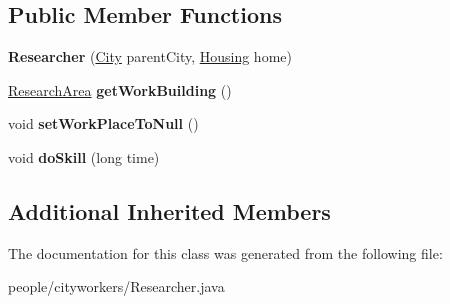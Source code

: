 \subsection*{Public Member Functions}
\begin{DoxyCompactItemize}
\item 
{\bfseries Researcher} (\hyperlink{classcities_1_1_city}{City} parent\+City, \hyperlink{classbuildings_1_1housing_1_1_housing}{Housing} home)\hypertarget{classpeople_1_1cityworkers_1_1_researcher_a28ed340e0d7dedaf7db8d75c72ba9c69}{}\label{classpeople_1_1cityworkers_1_1_researcher_a28ed340e0d7dedaf7db8d75c72ba9c69}

\item 
\hyperlink{classbuildings_1_1workplaces_1_1_research_area}{Research\+Area} {\bfseries get\+Work\+Building} ()\hypertarget{classpeople_1_1cityworkers_1_1_researcher_a0f3f0b62dfcc7e32f409f71619c5fa8e}{}\label{classpeople_1_1cityworkers_1_1_researcher_a0f3f0b62dfcc7e32f409f71619c5fa8e}

\item 
void {\bfseries set\+Work\+Place\+To\+Null} ()\hypertarget{classpeople_1_1cityworkers_1_1_researcher_a1ab4ebf08a19cb68c3372e1bd8244004}{}\label{classpeople_1_1cityworkers_1_1_researcher_a1ab4ebf08a19cb68c3372e1bd8244004}

\item 
void {\bfseries do\+Skill} (long time)\hypertarget{classpeople_1_1cityworkers_1_1_researcher_a862162c27e108ae816e2bef5d2a2e634}{}\label{classpeople_1_1cityworkers_1_1_researcher_a862162c27e108ae816e2bef5d2a2e634}

\end{DoxyCompactItemize}
\subsection*{Additional Inherited Members}


The documentation for this class was generated from the following file\+:\begin{DoxyCompactItemize}
\item 
people/cityworkers/Researcher.\+java\end{DoxyCompactItemize}
